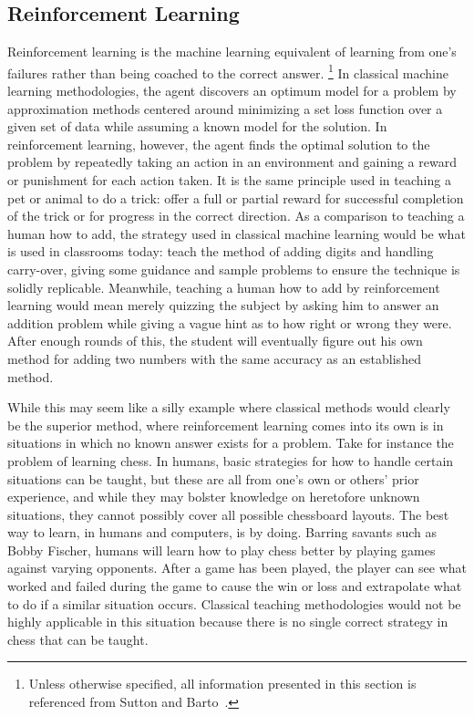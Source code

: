 \subsection{Reinforcement Learning}
\label{sec:intro-reinf}



Reinforcement learning is the machine learning equivalent of learning from one's
failures
rather than being coached to the correct answer.%
\footnote{
	Unless otherwise specified,
	all information presented in this section is referenced from
	Sutton and Barto~\cite{rl_book}.
}
%
In classical machine learning methodologies,
the agent discovers an optimum model for a problem by approximation methods
centered around minimizing a set loss function over a given set of data
while assuming a known model for the solution.
%
In reinforcement learning,
however,
the agent finds the optimal solution to the problem by repeatedly taking an
action in an environment and gaining a reward or punishment for each
action taken.
%
It is the same principle used in teaching a pet or animal to do a trick:
offer a full or partial reward for successful completion of the trick or
for progress in the correct direction.
%
As a comparison to teaching a human how to add,
the strategy used in classical machine learning would be what is used in
classrooms today:
teach the method of adding digits and handling carry-over,
giving some guidance and sample problems to ensure the technique is solidly
replicable.
%
Meanwhile, teaching a human how to add by reinforcement learning would
mean merely quizzing the subject by asking him to answer an addition problem
while giving a vague hint as to how right or wrong they were.
%
After enough rounds of this,
the student will eventually figure out his own method for adding two numbers
with the same accuracy as an established method.

While this may seem like a silly example where classical methods would clearly
be the superior method,
where reinforcement learning comes into its own is in situations in which no
known answer exists for a problem.
%
Take for instance the problem of learning chess.
%
In humans,
basic strategies for how to handle certain situations can be taught,
but these are all from one's own or others' prior experience,
and while they may bolster knowledge on heretofore unknown situations,
they cannot possibly cover all possible chessboard layouts.
%
The best way to learn, in humans and computers, is by doing.
%
Barring savants such as Bobby Fischer,
humans will learn how to play chess better by playing games against varying
opponents.
%
After a game has been played,
the player can see what worked and failed during the game to cause the win or
loss and extrapolate what to do if a similar situation occurs.
%
Classical teaching methodologies would not be highly applicable in this
situation because there is no single correct strategy in chess that can
be taught.





